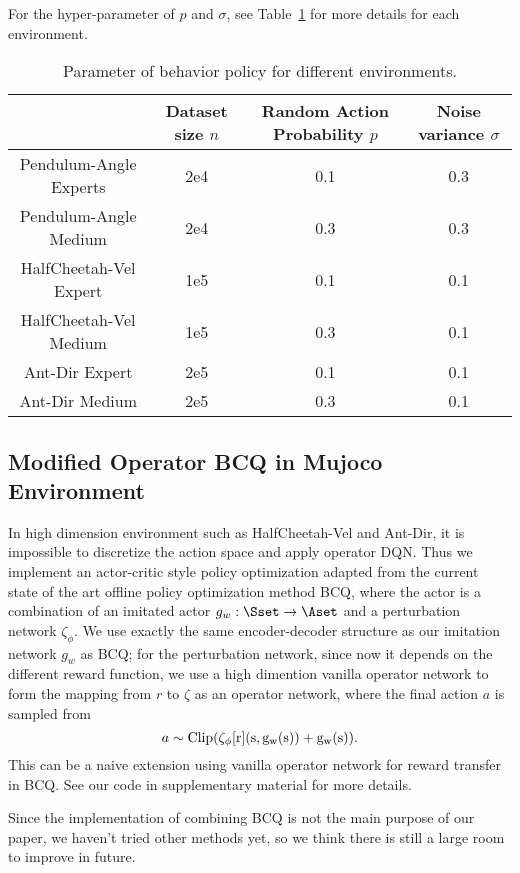 For the hyper-parameter of $p$ and $\sigma$, see Table~\ref{tab:offline_construction} for more details for each environment.

\begin{table}[h]
    \centering
    \begin{tabular}{|c|c|c|c|}
    \hline 
        & Dataset size $n$ & Random Action Probability $p$ & Noise variance $\sigma$ \\\hline 
        Pendulum-Angle Experts & 2e4 & 0.1 & 0.3 \\\hline 
        Pendulum-Angle Medium & 2e4 & 0.3 & 0.3\\\hline 
        HalfCheetah-Vel Expert& 1e5& 0.1 & 0.1\\\hline 
        HalfCheetah-Vel Medium& 1e5& 0.3 & 0.1\\\hline 
        Ant-Dir Expert &2e5 & 0.1 & 0.1\\\hline 
        Ant-Dir Medium &2e5 & 0.3 & 0.1\\\hline 
    \end{tabular}
    \caption{Parameter of behavior policy for different environments.}
    \label{tab:offline_construction}
\end{table}

\subsection{Modified Operator BCQ in Mujoco Environment}
In high dimension environment such as HalfCheetah-Vel and Ant-Dir, it is impossible to discretize the action space and apply operator DQN.
Thus we implement an actor-critic style policy optimization adapted from the current state of the art offline policy optimization method BCQ\citep{fujimoto2019off}, where the actor is a combination of an imitated actor $g_w:\Sset\to\Aset$ and a perturbation network $\zeta_\phi$.
We use exactly the same encoder-decoder structure as our imitation network $g_w$ as BCQ;
for the perturbation network, since now it depends on the different reward function, we use a high dimention vanilla operator network to form the mapping from
$r$ to $\zeta$ as an operator network, where the final action $a$ is sampled from
$$
    a \sim \rm{Clip}(\zeta_\phi[r](s,g_w(s)) + g_w(s)).
$$
This can be a naive extension using vanilla operator network for reward transfer in BCQ.
See our code in supplementary material for more details.

Since the implementation of combining BCQ is not the main purpose of our paper, we haven't tried other methods yet, so we think there is still a large room to improve in future.
